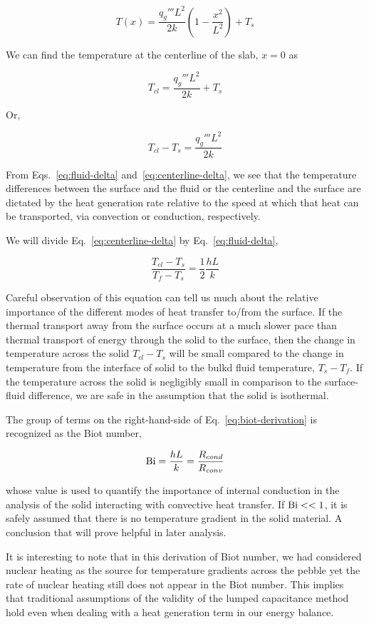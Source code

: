 \begin{equation}
	T(x) = \frac{q_g''' L^2}{2k}\left(1-\frac{x^2}{L^2}\right) + T_s
\end{equation}

We can find the temperature at the centerline of the slab, $x = 0$ as

\begin{equation}
	T_{cl} = \frac{q_g''' L^2}{2k} + T_s
\end{equation}

Or,

\begin{equation}\label{eq:centerline-delta}
	T_{cl} - T_s = \frac{q_g''' L^2}{2k}
\end{equation}

From Eqs.~\ref{eq:fluid-delta} and~\ref{eq:centerline-delta}, we see that the temperature differences between the surface and the fluid or the centerline and the surface are dictated by the heat generation rate relative to the speed at which that heat can be transported, via convection or conduction, respectively.

We will divide Eq.~\ref{eq:centerline-delta} by Eq.~\ref{eq:fluid-delta},

\begin{equation}\label{eq:biot-derivation}
	\frac{T_{cl} - T_s}{T_f-T_s} = \frac{1}{2}\frac{hL}{k}
\end{equation}

Careful observation of this equation can tell us much about the relative importance of the different modes of heat transfer to/from the surface. If the thermal transport away from the surface occurs at a much slower pace than thermal transport of energy through the solid to the surface, then the change in temperature across the solid $T_{cl}-T_{s}$ will be small compared to the change in temperature from the interface of solid to the bulkd fluid temperature, $T_{s}-T_f$. If the temperature across the solid is negligibly small in comparison to the surface-fluid difference, we are safe in the assumption that the solid is isothermal.

The group of terms on the right-hand-side of Eq.~\ref{eq:biot-derivation} is recognized as the Biot number,

\begin{equation}\label{eq:biot-number}
	\mathrm{Bi}=\frac{hL}{k}=\frac{R_{cond}}{R_{conv}}
\end{equation}

whose value is used to quantify the importance of internal conduction in the analysis of the solid interacting with convective heat transfer. If $\mathrm{Bi}<<1$, it is safely assumed that there is no temperature gradient in the solid material. A conclusion that will prove helpful in later analysis.

It is interesting to note that in this derivation of Biot number, we had considered nuclear heating as the source for temperature gradients across the pebble yet the rate of nuclear heating still does not appear in the Biot number. This implies that traditional assumptions of the validity of the lumped capacitance method hold even when dealing with a heat generation term in our energy balance.


